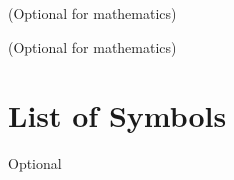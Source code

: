 \documentclass{IISERB}
\begin{document}
\singlespacing
{}
\renewcommand{\bibname}{References} %



\listoffigures

(Optional for mathematics)


\listoftables

(Optional for mathematics)


\chapter{List of Symbols}

Optional







\end{document}
